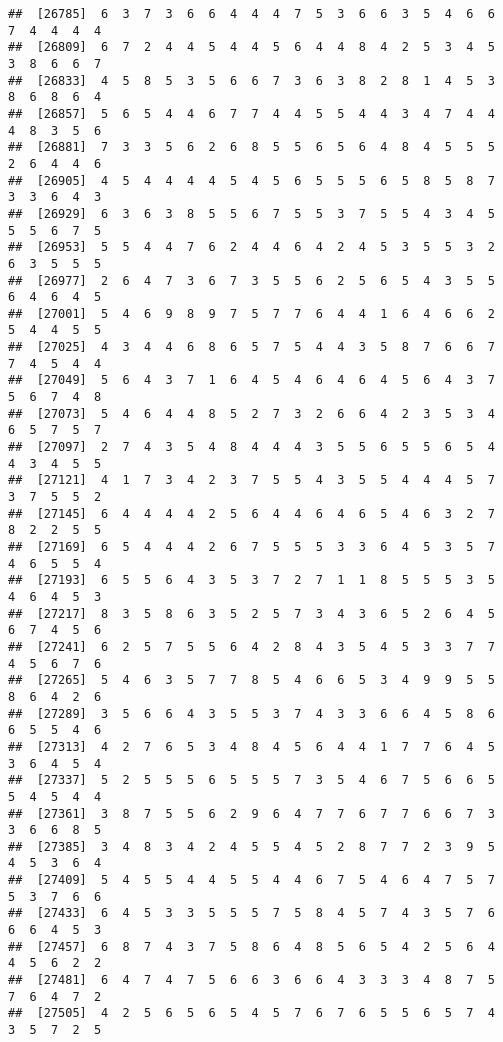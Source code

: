 \documentclass[
]{book}
\begin{document}
\begin{verbatim}
##  [26785]  6  3  7  3  6  6  4  4  4  7  5  3  6  6  3  5  4  6  6  7  4  4  4  4
##  [26809]  6  7  2  4  4  5  4  4  5  6  4  4  8  4  2  5  3  4  5  3  8  6  6  7
##  [26833]  4  5  8  5  3  5  6  6  7  3  6  3  8  2  8  1  4  5  3  8  6  8  6  4
##  [26857]  5  6  5  4  4  6  7  7  4  4  5  5  4  4  3  4  7  4  4  4  8  3  5  6
##  [26881]  7  3  3  5  6  2  6  8  5  5  6  5  6  4  8  4  5  5  5  2  6  4  4  6
##  [26905]  4  5  4  4  4  4  5  4  5  6  5  5  5  6  5  8  5  8  7  3  3  6  4  3
##  [26929]  6  3  6  3  8  5  5  6  7  5  5  3  7  5  5  4  3  4  5  5  5  6  7  5
##  [26953]  5  5  4  4  7  6  2  4  4  6  4  2  4  5  3  5  5  3  2  6  3  5  5  5
##  [26977]  2  6  4  7  3  6  7  3  5  5  6  2  5  6  5  4  3  5  5  6  4  6  4  5
##  [27001]  5  4  6  9  8  9  7  5  7  7  6  4  4  1  6  4  6  6  2  5  4  4  5  5
##  [27025]  4  3  4  4  6  8  6  5  7  5  4  4  3  5  8  7  6  6  7  7  4  5  4  4
##  [27049]  5  6  4  3  7  1  6  4  5  4  6  4  6  4  5  6  4  3  7  5  6  7  4  8
##  [27073]  5  4  6  4  4  8  5  2  7  3  2  6  6  4  2  3  5  3  4  6  5  7  5  7
##  [27097]  2  7  4  3  5  4  8  4  4  4  3  5  5  6  5  5  6  5  4  4  3  4  5  5
##  [27121]  4  1  7  3  4  2  3  7  5  5  4  3  5  5  4  4  4  5  7  3  7  5  5  2
##  [27145]  6  4  4  4  4  2  5  6  4  4  6  4  6  5  4  6  3  2  7  8  2  2  5  5
##  [27169]  6  5  4  4  4  2  6  7  5  5  5  3  3  6  4  5  3  5  7  4  6  5  5  4
##  [27193]  6  5  5  6  4  3  5  3  7  2  7  1  1  8  5  5  5  3  5  4  6  4  5  3
##  [27217]  8  3  5  8  6  3  5  2  5  7  3  4  3  6  5  2  6  4  5  6  7  4  5  6
##  [27241]  6  2  5  7  5  5  6  4  2  8  4  3  5  4  5  3  3  7  7  4  5  6  7  6
##  [27265]  5  4  6  3  5  7  7  8  5  4  6  6  5  3  4  9  9  5  5  8  6  4  2  6
##  [27289]  3  5  6  6  4  3  5  5  3  7  4  3  3  6  6  4  5  8  6  6  5  5  4  6
##  [27313]  4  2  7  6  5  3  4  8  4  5  6  4  4  1  7  7  6  4  5  3  6  4  5  4
##  [27337]  5  2  5  5  5  6  5  5  5  7  3  5  4  6  7  5  6  6  5  5  4  5  4  4
##  [27361]  3  8  7  5  5  6  2  9  6  4  7  7  6  7  7  6  6  7  3  3  6  6  8  5
##  [27385]  3  4  8  3  4  2  4  5  5  4  5  2  8  7  7  2  3  9  5  4  5  3  6  4
##  [27409]  5  4  5  5  4  4  5  5  4  4  6  7  5  4  6  4  7  5  7  5  3  7  6  6
##  [27433]  6  4  5  3  3  5  5  5  7  5  8  4  5  7  4  3  5  7  6  6  6  4  5  3
##  [27457]  6  8  7  4  3  7  5  8  6  4  8  5  6  5  4  2  5  6  4  4  5  6  2  2
##  [27481]  6  4  7  4  7  5  6  6  3  6  6  4  3  3  3  4  8  7  5  7  6  4  7  2
##  [27505]  4  2  5  6  5  6  5  4  5  7  6  7  6  5  5  6  5  7  4  3  5  7  2  5

\end{verbatim}
\end{document}
